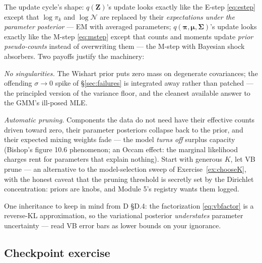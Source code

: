 \documentclass[11pt]{article}
\numberwithin{equation}{section}
\theoremstyle{plain}
\theoremstyle{definition}
\theoremstyle{remark}
\newcounter{exercise}
\newcommand{\Normal}{\mathcal{N}}
\newcommand{\bmu}{\bm{\mu}}
\newcommand{\bSigma}{\bm{\Sigma}}
\newcommand{\bpi}{\bm{\pi}}
\begin{document}
The update cycle's shape: $q(\bm Z)$'s update looks exactly like the E-step \eqref{eq:estep} except that $\log \pi_k$ and $\log \Normal$ are replaced by their \emph{expectations under the parameter posterior} --- EM with averaged parameters; $q(\bpi, \bmu, \bSigma)$'s update looks exactly like the M-step \eqref{eq:mstep} except that counts and moments update \emph{prior pseudo-counts} instead of overwriting them --- the M-step with Bayesian shock absorbers. Two payoffs justify the machinery:

\emph{No singularities.} The Wishart prior puts zero mass on degenerate covariances; the offending $\sigma \to 0$ spike of \S\ref{sec:failures} is integrated away rather than patched --- the principled version of the variance floor, and the cleanest available answer to the GMM's ill-posed MLE.

\emph{Automatic pruning.} Components the data do not need have their effective counts driven toward zero, their parameter posteriors collapse back to the prior, and their expected mixing weights fade --- the model \emph{turns off} surplus capacity (Bishop's figure 10.6 phenomenon; an Occam effect: the marginal likelihood charges rent for parameters that explain nothing). Start with generous $K$, let VB prune --- an alternative to the model-selection sweep of Exercise~\ref{ex:chooseK}, with the honest caveat that the pruning threshold is secretly set by the Dirichlet concentration: priors are knobs, and Module 5's registry wants them logged.

One inheritance to keep in mind from D \S D.4: the factorization \eqref{eq:vbfactor} is a reverse-KL approximation, so the variational posterior \emph{understates} parameter uncertainty --- read VB error bars as lower bounds on your ignorance.


\subsection*{Checkpoint exercise}
\end{document}
